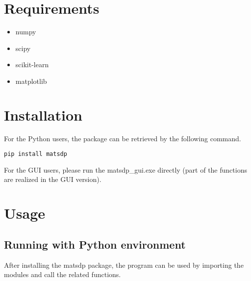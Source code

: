 \documentclass[12pt]{book}
\begin{document}
%

\section{Requirements}
\begin{itemize}
\item numpy
\item scipy
\item scikit-learn
\item matplotlib
\end{itemize}

\section{Installation}
For the Python users, the package can be retrieved by the following command. 
\begin{lstlisting}
pip install matsdp
\end{lstlisting}

For the GUI users, please run the matsdp\_gui.exe directly (part of the functions are realized in the GUI version).

\section{Usage}
\subsection{Running with Python environment}
After installing the matsdp package, the program can be used by importing the modules and call the related functions.
\end{document}
